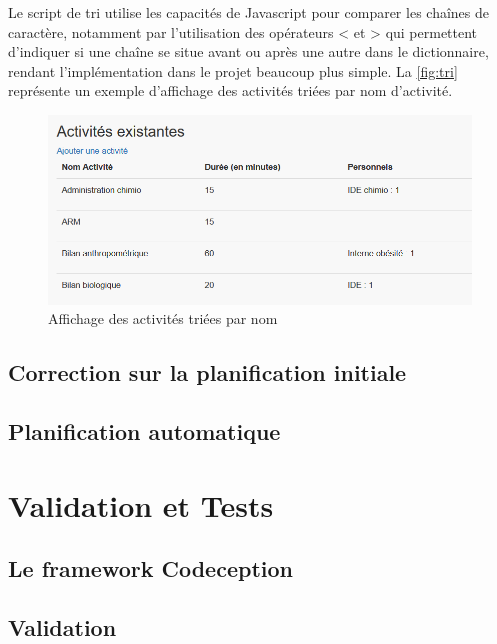 \documentclass[noposter]{polytech/polytech}
\begin{document}
Le script de tri utilise les capacités de Javascript pour comparer les chaînes de caractère, notamment par l'utilisation des opérateurs < et > qui permettent d'indiquer si une chaîne se situe avant ou après une autre dans le dictionnaire, rendant l'implémentation dans le projet beaucoup plus simple. La \autoref{fig:tri} représente un exemple d'affichage des activités triées par nom d'activité. 

\begin{figure}
	\includegraphics[scale=0.5]{images/tri}
	\caption{Affichage des activités triées par nom}
	\label{fig:tri}
\end{figure}


\section{Correction sur la planification initiale}



\section{Planification automatique}



\chapter{Validation et Tests}


\section{Le framework Codeception}


\section{Validation}
\end{document}
